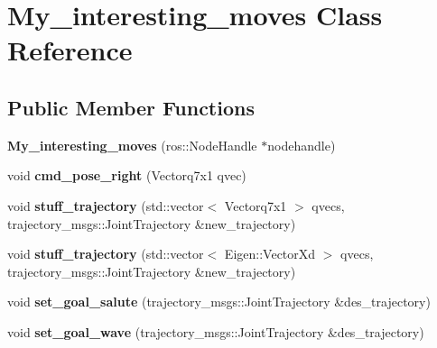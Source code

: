 \hypertarget{class_my__interesting__moves}{\section{My\-\_\-interesting\-\_\-moves Class Reference}
\label{class_my__interesting__moves}
}
\subsection*{Public Member Functions}
\begin{DoxyCompactItemize}
\item 
\hypertarget{class_my__interesting__moves_a44488352d77bb8097e2b0f910773c4ef}{{\bfseries My\-\_\-interesting\-\_\-moves} (ros\-::\-Node\-Handle $\ast$nodehandle)}\label{class_my__interesting__moves_a44488352d77bb8097e2b0f910773c4ef}

\item 
\hypertarget{class_my__interesting__moves_a98c8be6ed93e0a5843d69adc1a9f6b78}{void {\bfseries cmd\-\_\-pose\-\_\-right} (Vectorq7x1 qvec)}\label{class_my__interesting__moves_a98c8be6ed93e0a5843d69adc1a9f6b78}

\item 
\hypertarget{class_my__interesting__moves_a3d5a80eaaa09a32bfc3fa89e2347ab66}{void {\bfseries stuff\-\_\-trajectory} (std\-::vector$<$ Vectorq7x1 $>$ qvecs, trajectory\-\_\-msgs\-::\-Joint\-Trajectory \&new\-\_\-trajectory)}\label{class_my__interesting__moves_a3d5a80eaaa09a32bfc3fa89e2347ab66}

\item 
\hypertarget{class_my__interesting__moves_af973bbfb3b1a1010bb96cf1b9e04f38d}{void {\bfseries stuff\-\_\-trajectory} (std\-::vector$<$ Eigen\-::\-Vector\-Xd $>$ qvecs, trajectory\-\_\-msgs\-::\-Joint\-Trajectory \&new\-\_\-trajectory)}\label{class_my__interesting__moves_af973bbfb3b1a1010bb96cf1b9e04f38d}

\item 
\hypertarget{class_my__interesting__moves_a24b401e5317503b97427f86445cd719f}{void {\bfseries set\-\_\-goal\-\_\-salute} (trajectory\-\_\-msgs\-::\-Joint\-Trajectory \&des\-\_\-trajectory)}\label{class_my__interesting__moves_a24b401e5317503b97427f86445cd719f}

\item 
\hypertarget{class_my__interesting__moves_a0b6c48d041a728f3fdca5dd578a5e41d}{void {\bfseries set\-\_\-goal\-\_\-wave} (trajectory\-\_\-msgs\-::\-Joint\-Trajectory \&des\-\_\-trajectory)}\label{class_my__interesting__moves_a0b6c48d041a728f3fdca5dd578a5e41d}


\end{DoxyCompactItemize}

